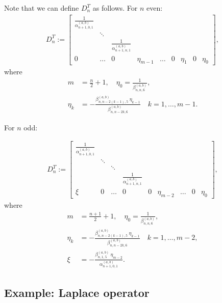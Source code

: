 \documentclass[11pt, oneside]{article}   	%
\newcommand{\alphaab}{\alpha^{(a,b)}}
\newcommand{\betaab}{\beta^{(a,b)}}
\newcommand{\Dnt}{D^T_n}
\begin{document}
Note that we can define \(\Dnt\) as follows. For \(n\) even:
\begin{align}
\Dnt := \begin{bmatrix}
		\frac{1}{\alphaab_{n+1,0,1}} & & &  \\
		& \ddots & & & \\
		& & \frac{1}{\alphaab_{n+1,n,1}} & \\
		0 & \hdots & 0 & \eta_{m-1} & \hdots & 0 & \eta_1 & 0 & \eta_0
	    \end{bmatrix},
\end{align}
where
\begin{align}
m &= \frac{n}{2} + 1, \quad \eta_0 = \frac{1}{\betaab_{n,n,6}}, \nonumber \\
\eta_k &= -\frac{\betaab_{n,n-2(k-1),5} \: \eta_{k-1}}{\betaab_{n,n-2k,6}} \quad k = 1,\dots,m-1.
\end{align}

For \(n\) odd:

\begin{align}
\Dnt := \begin{bmatrix}
		\frac{1}{\alphaab_{n+1,0,1}} & &  \\
		& \ddots & & &  \\
		& & \ddots & & \\
		& & & \frac{1}{\alphaab_{n+1,n,1}} & \\
		\xi & 0 & \hdots & 0 & 0 & \eta_{m-2} & \hdots & 0 & \eta_0
	    \end{bmatrix},
\end{align}
 where
\begin{align}
m &= \frac{n+1}{2} + 1, \quad \eta_0 = \frac{1}{\betaab_{n,n,6}}, \nonumber \\
\eta_k &= -\frac{\betaab_{n,n-2(k-1),5} \: \eta_{k-1}}{\betaab_{n,n-2k,6}} \quad k = 1,\dots,m-2, \\
\xi &= -\frac{\betaab_{n,1,5} \: \eta_{m-2}}{\alphaab_{n+1,0,1}}. \nonumber
\end{align}

\subsection{Example: Laplace operator}
\end{document}
